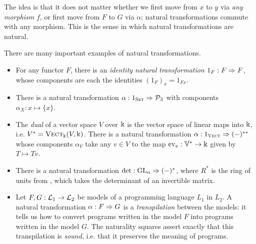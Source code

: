 The idea is that it does not matter whether we first move from $x$ to $y$ via
\emph{any morphism} $f$, or first move from $F$ to $G$ via $\alpha$; natural
transformations commute with any morphism. This is the sense in which natural
transformations are natural.

\begin{ex}
  There are many important examples of natural transformations.
  \begin{itemize}
    \item For any functor $F$, there is an \emph{identity natural transformation
      $1_F: F\Rightarrow F$}, whose components are each the identities $(1_F)_x = 1_{Fx}$.
    \item There is a natural transformation $\alpha: 1_{\textsc{\text{Set}}}\Rightarrow
      \mathcal{P}_\exists$ with components $\alpha_X: x\mapsto \{x\}$.
    \item The \emph{dual} of a vector space $V$ over $\Bbbk$ is the vector space
      of linear maps into $\Bbbk$, i.e. $V^* = {\textsc{\text{Vect}}}_\Bbbk(V, \Bbbk)$. There is
      a natural transformation $\alpha: 1_{{\textsc{\text{Vect}}}}\Rightarrow (-)^{**}$ whose
      components $\alpha_V$ take any $v\in V$ to the map $\text{ev}_v:
      \mathbb{V}^*\to\Bbbk$ given by $T\mapsto Tv$.
    \item There is a natural transformation $\det:\text{GL}_n\Rightarrow (-)^*$, where
      $R^*$ is the ring of units from , which
      takes the determinant of an invertible matrix.
    \item Let $F,G:\mathcal{L}_1\to\mathcal{L}_2$ be models of a programming language $L_1$ in
      $L_2$. A natural transformation $\alpha: F\Rightarrow G$ is a \emph{transpilation}
      between the models: it tells us how to convert programs written in the
      model $F$ into programs written in the model $G$. The naturality squares
      assert exactly that this transpilation is \emph{sound}, i.e. that it
      preserves the meaning of programs.
 \end{itemize}
\end{ex}

